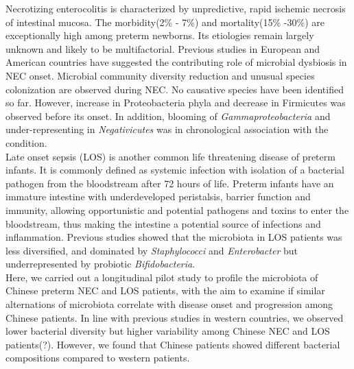 \documentclass[fleqn,10pt]{wlpeerj} %
\begin{document}
\noindent
Necrotizing enterocolitis is characterized by unpredictive, rapid ischemic necrosis of intestinal mucosa. The morbidity(2\% - 7\%) and mortality(15\% -30\%)\citep{stoll2015trends} are exceptionally high among preterm newborns\citep{neu2011necrotizing}. Its etiologies remain largely unknown and likely to be multifactorial. Previous studies in European and American countries have suggested the contributing role of microbial dysbiosis in NEC onset. Microbial community diversity reduction and unusual species colonization are observed during NEC\citep{jacquot2011dynamics,Warner2016a}. No causative species have been identified so far. However, increase in Proteobacteria phyla and decrease in Firmicutes was observed before its onset\citep{mai2011fecal, zhou2015longitudinal}. In addition, blooming of \textit{Gammaproteobacteria} and under-representing in \textit{Negativicutes} was in chronological association with the condition\citep{Warner2016a}.\\

\noindent
Late onset sepsis (LOS) is another common life threatening disease of preterm infants. It is commonly defined as systemic infection with isolation of a bacterial pathogen from the bloodstream after 72 hours of life\citep{rao2016one, pickering2012red}. Preterm infants have an immature intestine with underdeveloped peristalsis, barrier function and immunity, allowing opportunistic and potential pathogens and toxins to enter the bloodstream\citep{korpela2018intestinal}, thus making the intestine a potential source of infections and inflammation. Previous studies showed that the microbiota in LOS patients was less diversified, and dominated by \textit{Staphylococci} and \textit{Enterobacter} but underrepresented by probiotic \textit{Bifidobacteria}\citep{madan2012gut,tarr2016gut,Stewart2017Longitudinal,korpela2018intestinal,ficara2018changes}.\\

\noindent
Here, we carried out a longitudinal pilot study to profile the microbiota of Chinese preterm NEC and LOS patients, with the aim to examine if similar alternations of microbiota correlate with disease onset and progression among Chinese patients. In line with previous studies in western countries, we observed lower bacterial diversity but higher variability among Chinese NEC and LOS patients(?).  However, we found that Chinese patients showed different bacterial compositions compared to western patients.\\


\end{document}
